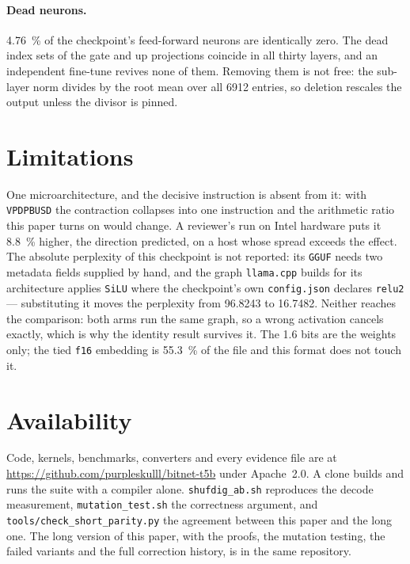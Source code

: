 \documentclass[11pt,a4paper]{article}
\newcommand{\code}[1]{\texttt{#1}}
\begin{document}
\paragraph{Dead neurons.} \SI{4.76}{\percent} of the checkpoint's feed-forward
neurons are identically zero. The dead index sets of the gate and up projections
coincide in all thirty layers, and an independent fine-tune revives none of
them. Removing them is not free: the sub-layer norm divides by the root mean
over all \num{6912} entries, so deletion rescales the output unless the divisor
is pinned.

\section{Limitations}\label{sec:limits}

One microarchitecture, and the decisive instruction is absent from it: with
\code{VPDPBUSD} the contraction collapses into one instruction and the arithmetic
ratio this paper turns on would change. A reviewer's run on Intel hardware puts
it \SI{8.8}{\percent} higher, the direction predicted, on a host whose spread
exceeds the effect. The absolute perplexity of this checkpoint is not reported:
its \code{GGUF} needs two metadata fields supplied by hand, and the graph
\code{llama.cpp} builds for its architecture applies \code{SiLU} where the
checkpoint's own \code{config.json} declares \code{relu2} --- substituting it
moves the perplexity from \num{96.8243} to \num{16.7482}. Neither reaches the
comparison: both arms run the same graph, so a wrong activation cancels exactly,
which is why the identity result survives it. The \num{1.6} bits are the
weights only; the tied \code{f16} embedding is \SI{55.3}{\percent} of the file
and this format does not touch it.

\section*{Availability}
Code, kernels, benchmarks, converters and every evidence file are at
\url{https://github.com/purpleskulll/bitnet-t5b} under Apache~2.0. A clone
builds and runs the suite with a compiler alone. \code{shufdig\_ab.sh}
reproduces the decode measurement, \code{mutation\_test.sh} the correctness
argument, and \code{tools/check\_short\_parity.py} the agreement between this
paper and the long one. The long version of this paper, with the proofs,
the mutation testing, the failed variants and the full correction history, is in
the same repository.
\end{document}
